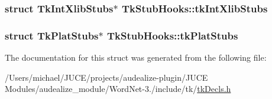 \subsubsection[{\texorpdfstring{tk\+Int\+Xlib\+Stubs}{tkIntXlibStubs}}]{\setlength{\rightskip}{0pt plus 5cm}struct Tk\+Int\+Xlib\+Stubs$\ast$ Tk\+Stub\+Hooks\+::tk\+Int\+Xlib\+Stubs}\hypertarget{struct_tk_stub_hooks_a9be5cddb8d929624a951b7573b9952b0}{}\label{struct_tk_stub_hooks_a9be5cddb8d929624a951b7573b9952b0}
\subsubsection[{\texorpdfstring{tk\+Plat\+Stubs}{tkPlatStubs}}]{\setlength{\rightskip}{0pt plus 5cm}struct Tk\+Plat\+Stubs$\ast$ Tk\+Stub\+Hooks\+::tk\+Plat\+Stubs}\hypertarget{struct_tk_stub_hooks_aa07ff4b87048eef11197f59d9e08af65}{}\label{struct_tk_stub_hooks_aa07ff4b87048eef11197f59d9e08af65}


The documentation for this struct was generated from the following file\+:\begin{DoxyCompactItemize}
\item 
/\+Users/michael/\+J\+U\+C\+E/projects/audealize-\/plugin/\+J\+U\+C\+E Modules/audealize\+\_\+module/\+Word\+Net-\/3./include/tk/\hyperlink{tk_decls_8h}{tk\+Decls.\+h}\end{DoxyCompactItemize}
